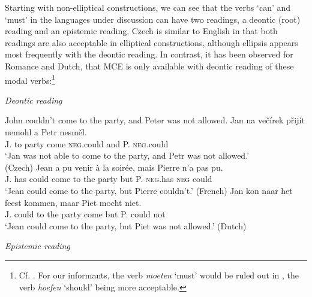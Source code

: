 \documentclass[output=paper,colorlinks,citecolor=brown,
modfonts
]{langscibook}
\begin{document}
Starting with non-elliptical constructions, we can see that the verbs `can' and `must' in the languages under discussion can have two readings, a deontic (root) reading and an epistemic reading. Czech is similar to English in that both readings are also acceptable in elliptical constructions, although ellipsis appears most frequently with the deontic reading. In contrast, it has been observed for Romance and Dutch, that MCE is only available with deontic reading of these modal verbs:\footnote{Cf. \cite{Barbiers1995,Lobeck1995,Aelbrecht2008}. For our informants, the verb \textit{moeten} ‘must’ would be ruled out in , the verb \textit{hoefen} ‘should’ being more acceptable.}

\begin{exe}
\ex	\textit{Deontic reading}\label{18}
\begin{xlist}
\ex\label{18a} John couldn't come to the party, and Peter was not allowed. 
\ex \label{18b}
\gll  Jan na večírek přijít  nemohl    a    Petr  nesměl.\\
J.    to  party    come \textsc{neg}.could  and P.     \textsc{neg}.could\\
\glt `Jan was not able to come to the party, and Petr was not allowed.' \\ { } \hfill (Czech)
\ex \label{18c} 
\gll  Jean a   pu venir  à  la soirée,  mais Pierre n'a  pas  pu. \\
J.  has could come to the party  but   P. {\textsc{neg}.has} \textsc{neg} could\\
\glt `Jean could come to the party, but Pierre couldn't.' \hfill  (French)
\ex\label{18d} 
\gll  Jan kon    naar het feest kommen, maar Piet mocht niet. \\
 J.   could to     the party come      but     P.    could   not\\
 \glt `Jean could come to the party, but Piet was not allowed.' \hfill (Dutch)
\end{xlist}

\ex \textit{Epistemic reading}\label{19}
\begin{xlist}
\end{xlist}
\end{exe}
\end{document}
